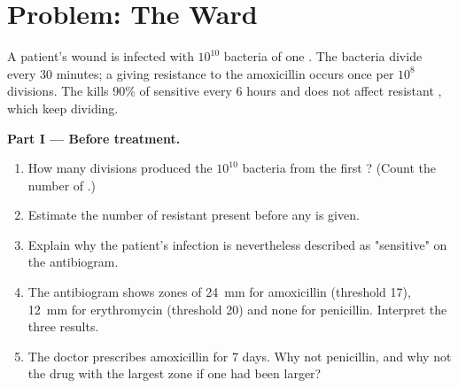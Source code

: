 \section{Problem: The Ward}

\begin{problem}
\label{pb:g11:antibiotic-resistance:1}
A patient's wound is infected with $10^{10}$ bacteria of one .
The bacteria divide every 30 minutes; a  giving resistance to
the  amoxicillin occurs once per $10^8$ divisions. The
 kills 90\% of sensitive  every 6 hours and does not
affect resistant , which keep dividing.

\medskip
\noindent\textbf{Part I --- Before treatment.}
\begin{enumerate}
  \item How many divisions produced the $10^{10}$ bacteria from the
        first ? (Count the number of .)
  \item Estimate the number of resistant  present before any
         is given.
  \item Explain why the patient's infection is nevertheless described
        as "sensitive" on the antibiogram.
  \item The antibiogram shows zones of \qty{24}{mm} for amoxicillin
        (threshold 17), \qty{12}{mm} for erythromycin (threshold 20)
        and none for penicillin. Interpret the three results.
  \item The doctor prescribes amoxicillin for 7 days. Why not
        penicillin, and why not the drug with the largest zone if
        one had been larger?
\end{enumerate}


\end{problem}
